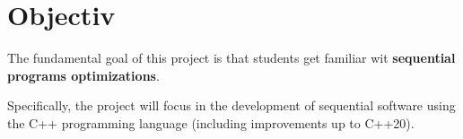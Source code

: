 \section{Objectiv}

The fundamental goal of this project is that students
get familiar wit \textbf{sequential programs optimizations}.

Specifically, the project will focus in the development of
sequential software using the C++ programming language
(including improvements up to C++20).
